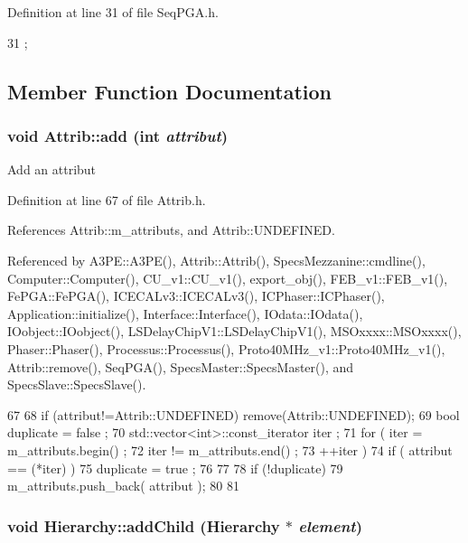 Definition at line 31 of file SeqPGA.h.


\begin{DoxyCode}
31 {}; 
\end{DoxyCode}


\subsection{Member Function Documentation}
\hypertarget{classAttrib_a235f773af19c900264a190b00a3b4ad7}{
\subsubsection[{add}]{\setlength{\rightskip}{0pt plus 5cm}void Attrib::add (int {\em attribut})}}
\label{classAttrib_a235f773af19c900264a190b00a3b4ad7}
Add an attribut 

Definition at line 67 of file Attrib.h.

References Attrib::m\_\-attributs, and Attrib::UNDEFINED.

Referenced by A3PE::A3PE(), Attrib::Attrib(), SpecsMezzanine::cmdline(), Computer::Computer(), CU\_\-v1::CU\_\-v1(), export\_\-obj(), FEB\_\-v1::FEB\_\-v1(), FePGA::FePGA(), ICECALv3::ICECALv3(), ICPhaser::ICPhaser(), Application::initialize(), Interface::Interface(), IOdata::IOdata(), IOobject::IOobject(), LSDelayChipV1::LSDelayChipV1(), MSOxxxx::MSOxxxx(), Phaser::Phaser(), Processus::Processus(), Proto40MHz\_\-v1::Proto40MHz\_\-v1(), Attrib::remove(), SeqPGA(), SpecsMaster::SpecsMaster(), and SpecsSlave::SpecsSlave().


\begin{DoxyCode}
67                             {
68     if (attribut!=Attrib::UNDEFINED) remove(Attrib::UNDEFINED);
69     bool duplicate = false ;
70     std::vector<int>::const_iterator iter ;
71     for ( iter  = m_attributs.begin() ;
72           iter != m_attributs.end()   ;
73           ++iter ) {
74       if ( attribut == (*iter) ) {
75         duplicate = true ;
76       }
77     }
78     if (!duplicate) {
79       m_attributs.push_back( attribut );
80     }
81   }
\end{DoxyCode}
\hypertarget{classHierarchy_ad677774ff38fcb257c04a3a10d471fac}{
\subsubsection[{addChild}]{\setlength{\rightskip}{0pt plus 5cm}void Hierarchy::addChild ({\bf Hierarchy} $\ast$ {\em element})}}
\label{classHierarchy_ad677774ff38fcb257c04a3a10d471fac}


